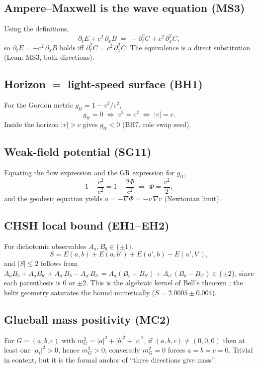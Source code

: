 \documentclass[aps,prd,preprint,superscriptaddress,amsmath,amssymb]{revtex4-2}
\begin{document}
\subsection{Ampere--Maxwell is the wave equation (MS3)}\label{app:ampere}

Using the definitions,
\[
\partial_t E + c^2\,\partial_x B
\;=\; -\partial_t^2 C + c^2\,\partial_x^2 C ,
\]
so $\partial_t E = -c^2\,\partial_x B$ holds iff
$\partial_t^2 C = c^2\,\partial_x^2 C$.  The equivalence is a direct
substitution (Lean: MS3, both directions).

\subsection{Horizon $=$ light-speed surface (BH1)}\label{app:bh}

For the Gordon metric $g_{tt}=1-v^2/c^2$,
\[
g_{tt}=0 \;\Longleftrightarrow\; v^2=c^2 \;\Longleftrightarrow\; |v|=c .
\]
Inside the horizon $|v|>c$ gives $g_{tt}<0$ (BH7, role swap seed).

\subsection{Weak-field potential (SG11)}\label{app:sg11}

Equating the flow expression and the GR expression for $g_{tt}$,
\[
1-\frac{v^2}{c^2} = 1-\frac{2\Phi}{c^2}
\;\Longrightarrow\; \Phi = \frac{v^2}{2},
\]
and the geodesic equation yields $a=-\nabla\Phi=-v\,\nabla v$ (Newtonian
limit).

\subsection{CHSH local bound (EH1--EH2)}\label{app:chsh}

For dichotomic observables $A_a,B_b\in\{\pm1\}$,
\[
S = E(a,b)+E(a,b')+E(a',b)-E(a',b'),
\]
and $|S|\leq2$ follows from $A_aB_b+A_aB_{b'}+A_{a'}B_b-A_{a'}B_{b'}
=A_a(B_b+B_{b'})+A_{a'}(B_b-B_{b'})\in\{\pm2\}$, since each parenthesis is
$0$ or $\pm2$.  This is the algebraic kernel of Bell's theorem
\cite{Bell1964}; the helix geometry saturates the bound numerically
($S=2.0005\pm0.004$).

\subsection{Glueball mass positivity (MC2)}\label{app:mc2}

For $G=(a,b,c)$ with $m_G^2=|a|^2+|b|^2+|c|^2$, if $(a,b,c)\neq(0,0,0)$
then at least one $|a_i|^2>0$, hence $m_G^2>0$; conversely $m_G^2=0$ forces
$a=b=c=0$.  Trivial in content, but it is the formal anchor of ``three
directions give mass''.
\end{document}
